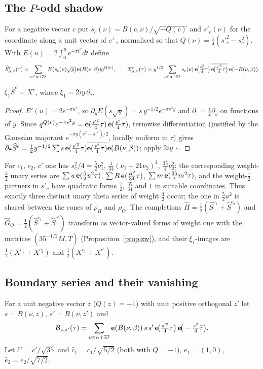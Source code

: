 \subsection{The $P$-odd shadow}
For a negative vector $c$ put $s_c(\nu)=B(c,\nu)/\sqrt{-Q(c)}$ and $s'_c(\nu)$ for the coordinate along a unit vector of $c^\perp$, normalised so that $Q(\nu)=\frac14(s'^2_c-s^2_c)$.
With $E(u)=2\int_0^ue^{-\pi t^2}dt$ define
\[ \widehat S^{c}_{\alpha,\beta}(\tau)=\sum_{\nu\in\alpha+\mathbb{Z}^2}E\big(s_c(\nu)\sqrt{y}\big)\mathbf{e}(B(\nu,\beta))q^{Q(\nu)},\qquad
X^c_{\alpha,\beta}(\tau)=y^{1/2}\sum_{\nu\in\alpha+\mathbb{Z}^2}s_c(\nu)\,\mathbf{e}\!\big(\tfrac{s_c^2}4\tau\big)\,\overline{\mathbf{e}\!\big(\tfrac{s'^2_c}4\tau\big)}\,\mathbf{e}(-B(\nu,\beta)). \]
\begin{proposition}\label{prop:xi}
$\xi_1\widehat S^c=X^c$, where $\xi_1=2iy\,\overline{\partial_{\bar\tau}}$.
\end{proposition}
\begin{proof}
$E'(u)=2e^{-\pi u^2}$, so $\partial_yE(s\sqrt y)=s\,y^{-1/2}e^{-\pi s^2y}$ and $\partial_{\bar\tau}=\frac i2\partial_y$ on functions of $y$. Since
$q^{Q(\nu)}e^{-\pi s^2y}=\mathbf{e}(\frac{s'^2}4\tau)\,\overline{\mathbf{e}(\frac{s^2}4\tau)}$, termwise differentiation (justified by the Gaussian majorant $e^{-\pi y(s^2+s'^2)/2}$, locally
uniform in $\tau$) gives $\partial_{\bar\tau}\widehat S^c=\frac i2y^{-1/2}\sum s\,\mathbf{e}(\frac{s'^2}4\tau)\overline{\mathbf{e}(\frac{s^2}4\tau)}\mathbf{e}(B(\nu,\beta))$; apply $2iy\,\overline{\cdot}$.
\end{proof}
For $c_1$, $c_2$, $c'$ one has $s_c^2/4=\frac52\nu_1^2$, $\frac1{34}(\nu_1+21\nu_2)^2$, $\frac{35}4\nu_2^2$; the corresponding weight-$\frac32$ unary series are
$\sum u\,\mathbf{e}(\frac52u^2\tau)$, $\sum R\,\mathbf{e}(\frac{R^2}{34}\tau)$, $\sum m\,\mathbf{e}(\frac{35}{4}m^2\tau)$, and the weight-$\frac12$ partners in $s'_c$ have quadratic forms $\frac72$,
$\frac{35}{34}$ and $1$ in suitable coordinates. Thus exactly three distinct unary theta series of weight $\frac32$ occur; the one in $\frac52u^2$ is shared between the cones
of $\rho_H$ and $\rho_O$. The completions $\widehat H=\frac12(\widehat S^{c_1}+\widehat S^{c_2})$ and $\widehat G_O=\frac12(\widehat S^{c_1}+\widehat S^{c'})$ transform as
vector-valued forms of weight one with the matrices $(35^{-1/2}M,T)$ (Proposition~\ref{prop:zw}), and their $\xi_1$-images are $\frac12(X^{c_1}+X^{c_2})$ and $\frac12(X^{c_1}+X^{c'})$.

\subsection{Boundary series and their vanishing}
For a unit negative vector $z$ ($Q(z)=-1$) with unit positive orthogonal $z'$ let $s=B(\nu,z)$, $s'=B(\nu,z')$ and
\[ \mathcal B_{z,z'}(\tau)=\sum_{\nu\in\alpha+\mathbb{Z}^2}\mathbf{e}(B(\nu,\beta))\,s\,s'\,\mathbf{e}\!\big(\tfrac{s'^2}4\tau\big)\,\mathbf{e}\!\big(-\tfrac{s^2}4\bar\tau\big). \]
Let $\hat c'=c'/\sqrt{35}$ and $\hat c_1=c_1/\sqrt{5/2}$ (both with $Q=-1$), $e_1=(1,0)$, $\hat e_2=e_2/\sqrt{7/2}$.

